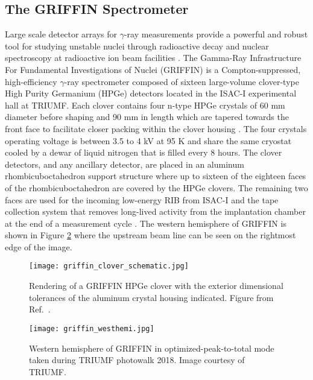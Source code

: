 \documentclass[cnatzke_thesis_proposal.tex]{subfiles}
\begin{document}
\subsection{The GRIFFIN Spectrometer}

Large scale detector arrays for $\gamma$-ray measurements provide a powerful and robust tool for studying unstable nuclei through radioactive decay and nuclear spectroscopy at radioactive ion beam facilities \cite{garnsworthy_griffin_2019}. 
The Gamma-Ray Infrastructure For Fundamental Investigations of Nuclei (GRIFFIN) is a Compton-suppressed, high-efficiency $\gamma$-ray spectrometer composed of sixteen large-volume clover-type High Purity Germanium (HPGe) detectors located in the ISAC-I experimental hall at TRIUMF. 
Each clover contains four n-type HPGe crystals of 60 mm diameter before shaping and 90 mm in length which are tapered towards the front face to facilitate closer packing within the clover housing \cite{rizwan_characteristics_2016}.
The four crystals operating voltage is between 3.5 to 4 kV at 95 K and share the same cryostat cooled by a dewar of liquid nitrogen that is filled every 8 hours. 
The clover detectors, and any ancillary detector, are placed in an aluminum rhombicuboctahedron support structure where up to sixteen of the eighteen faces of the rhombicuboctahedron are covered by the HPGe clovers.
The remaining two faces are used for the incoming low-energy RIB from ISAC-I and the tape collection system that removes long-lived activity from the implantation chamber at the end of a measurement cycle \cite{garnsworthy_griffin_2019}. 
The western hemisphere of GRIFFIN is shown in Figure \ref{fig:griffin_westhemi} where the upstream beam line can be seen on the rightmost edge of the image. 

\begin{center}
  \begin{figure}[H]
    \begin{center}
      \texttt{[image: griffin\_clover\_schematic.jpg]}
    \end{center}
    \caption{Rendering of a GRIFFIN HPGe clover with the exterior dimensional tolerances of the aluminum crystal housing indicated. Figure from Ref.~\cite{rizwan_characteristics_2016}.}
    \label{fig:griffin_clover_schematic}
  \end{figure}
\end{center}

\begin{center}
  \begin{figure}[H]
    \begin{center}
      \texttt{[image: griffin\_westhemi.jpg]}
    \end{center}
    \caption{Western hemisphere of GRIFFIN in optimized-peak-to-total mode taken during TRIUMF photowalk 2018. Image courtesy of TRIUMF.}
    \label{fig:griffin_westhemi}
  \end{figure}
\end{center}
\end{document}
